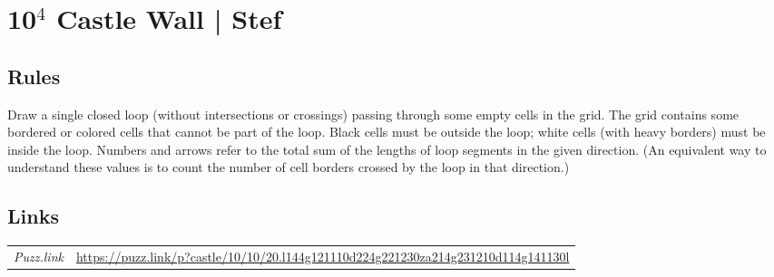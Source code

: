 \section[10$^4$ Castle Wall | Stef {[\emph{Castle Wall}]}]{10$^4$ Castle Wall | {\normalfont Stef}}
\label{sec:37-104-castle-wall-stef}

\subsection*{Rules}
\begin{markdown}
Draw a single closed loop (without intersections or crossings) passing through some empty cells in the grid. The grid contains some bordered or colored cells that cannot be part of the loop. Black cells must be outside the loop; white cells (with heavy borders) must be inside the loop. Numbers and arrows refer to the total sum of the lengths of loop segments in the given direction. (An equivalent way to understand these values is to count the number of cell borders crossed by the loop in that direction.)
\end{markdown}
\subsection*{Links}
\begin{tabularx}{\textwidth}{l X}
\emph{Puzz.link} & \url{https://puzz.link/p?castle/10/10/20.l144g121110d224g221230za214g231210d114g141130l} \\
\end{tabularx}
\pagebreak
